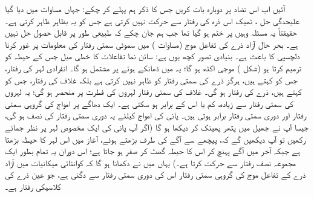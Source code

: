 آئیں اب اس تضاد پر دوبارہ بات کریں جس کا ذکر ہم پہلے کر چکے: جہاں مساوات  میں دیا گیا علیحدگی حل ، ٹھیک اس ذرہ کی رفتار سے حرکت نہیں کرتی ہے جس کو یہ بظاہر ظاہر کرتی ہے۔ حقیقتاً یہ مسئلہ وہیں پر ختم ہو گیا تھا جب ہم جان چکے کہ  طبیعی طور پر قابل حصول حل نہیں ہے۔ بحر حال آزاد ذرے کی تفاعل موج (مساوات ) میں سموئی سمتی رفتار کی معلومات پر غور کرنا دلچسپی کا باعث ہے۔ بنیادی تصور کچھ یوں ہے: سائن نما تفاعلات کا خطی میل جس کے حیطہ کو  ترمیم کرتا ہو (شکل ) موجی اکٹھ ہو گا؛ یہ  میں ڈھانکے ہوئے  پر مشتمل ہو گا۔ انفرادی لہر کی رفتار، جس کو   کہتے ہیں، ہرگز ذرے کی سمتی رفتار کو ظاہر نہیں کرتی ہے بلکہ غلاف کی رفتار، جس کو  کہتے ہیں، ذرے کی رفتار ہو گی۔ غلاف کی سمتی رفتار لہروں کی فطرت پر منحصر ہو گی؛ یہ لہروں کی سمتی رفتار سے زیادہ، کم یا اس کے برابر ہو سکتی ہے۔ ایک دھاگے پر امواج کی گروہی سمتی رفتار اور دوری سمتی رفتار برابر ہوتی ہیں۔ پانی کی امواج کیلئے یہ دوری سمتی رفتار کی نصف ہو گی، جیسا آپ نے جھیل میں پتھر پھینک کر دیکھا ہو گا (اگر آپ پانی کی ایک مخصوص لہر پر نظر جمائے رکھیں تو آپ دیکھیں گے کہ، پیچھے سے آگے کی طرف بڑھتے ہوئے، آغاز میں اس لہر کا حیطہ بڑھتا ہے جبکہ آخر میں آگے پہنچ کر اس کا حیطہ گھٹ کر صفر ہو جاتا ہے؛ اس دوران یہ تمام بطور ایک مجموعہ نصف رفتار سے حرکت کرتا ہے۔) یہاں میں نے دکھانا ہو گا کہ کوانٹائی میکانیات میں آزاد ذرے کے تفاعل موج کی گروہی سمتی رفتار اس کی دوری سمتی رفتار سے دگنی ہے، جو عین ذرے کی کلاسیکی رفتار ہے۔

